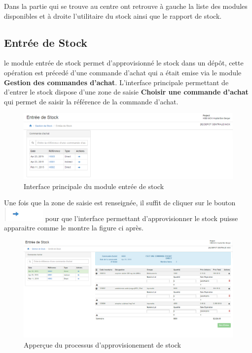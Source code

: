 \documentclass[12pt,a4paper]{report}
\begin{document}
Dans la partie qui se trouve au centre ont retrouve à gauche la liste des modules disponibles et à droite l'utilitaire du stock ainsi que le rapport de stock.


\subsection{Entrée de Stock}
le module entrée de stock permet d'approvisionné le stock dans un dépôt, cette opération est précedé d'une commande d'achat qui a était emise via le module \textbf{Gestion des commandes d'achat}. L'interface principale permettant de d'entrer le stock dispose d'une zone de saisie \textbf{Choisir une commande d'achat} qui permet de saisir la référence de la commande d'achat.

\begin{figure}[h]
\begin{center}
\includegraphics[width=12cm]{pic/EntreStock.png}
\end{center}
\caption{Interface principale du module entrée de stock}
\label{Interface principale du module entrée de stock}
\end{figure}

Une fois que la zone de saisie est renseignée, il suffit de cliquer sur le bouton  \includegraphics[scale=0.7]{pic/BlueArrow.png} pour que l'interface permettant d'approvisionner le stock puisse apparaitre comme le montre la figure ci après.

\begin{figure}[h]
\begin{center}
\includegraphics[width=14cm]{pic/EntreStockForm.png}
\end{center}
\caption{Apperçue du processus d'approvisionement de stock}
\label{Apperçue du processus d'approvisionement de stock}
\end{figure}
\end{document}
